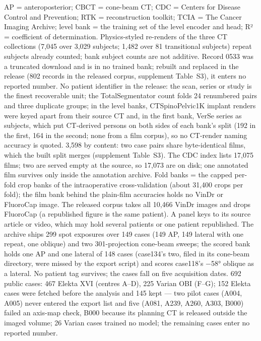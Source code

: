 \begin{table}[p]
{\begin{minipage}{23.2cm}
\begin{tabular}
\bottomrule
\end{tabular}
\par\vspace{1pt}
\begingroup\fontsize{7}{7.6}\selectfont\raggedright
AP = anteroposterior; CBCT = cone-beam CT; CDC = Centers for Disease Control and Prevention; RTK = reconstruction toolkit; TCIA = The Cancer Imaging Archive; level bank = the training set of the level encoder and head; R² = coefficient of determination.
Physics-styled re-renders of the three CT collections (7,045 over 3,029 subjects; 1,482 over 81 transitional subjects) repeat subjects already counted; bank subject counts are not additive.
Record 0533 was a truncated download and is in no trained bank; rebuilt and replaced in the release (802 records in the released corpus, supplement Table~S3), it enters no reported number.
No patient identifier in the release: the scan, series or study is the finest recoverable unit; the TotalSegmentator count folds 24 renumbered pairs and three duplicate groups; in the level banks, CTSpinoPelvic1K implant renders were keyed apart from their source CT and, in the first bank, VerSe series as subjects, which put CT-derived persons on both sides of each bank's split (192 in the first, 164 in the second; none from a film corpus), so no CT-render naming accuracy is quoted.
3,598 by content: two case pairs share byte-identical films, which the built split merges (supplement Table~S3).
The CDC index lists 17,075 films; two are served empty at the source, so 17,073 are on disk; one annotated film survives only inside the annotation archive.
Fold banks = the capped per-fold crop banks of the intraoperative cross-validation (about 31,400 crops per fold); the film bank behind the plain-film accuracies holds no VinDr or FluoroCap image. The released corpus takes all 10,466 VinDr images and drops FluoroCap (a republished figure is the same patient).
A panel keys to its source article or video, which may hold several patients or one patient republished.
The archive ships 299 spot exposures over 149 cases (149 AP, 149 lateral with one repeat, one oblique) and two 301-projection cone-beam sweeps; the scored bank holds one AP and one lateral of 148 cases (case134's two, filed in its cone-beam directory, were missed by the export script) and scores case118's −58° oblique as a lateral. No patient tag survives; the cases fall on five acquisition dates.
692 public cases: 467 Elekta XVI (centres A--D), 225 Varian OBI (F--G); 152 Elekta cases were fetched before the analysis and 145 kept --- two pilot cases (A004, A005) never entered the export list and five (A081, A239, A260, A303, B000) failed an axis-map check, B000 because its planning CT is released outside the imaged volume; 26 Varian cases trained no model; the remaining cases enter no reported number.

\end{minipage}}
\end{table}
